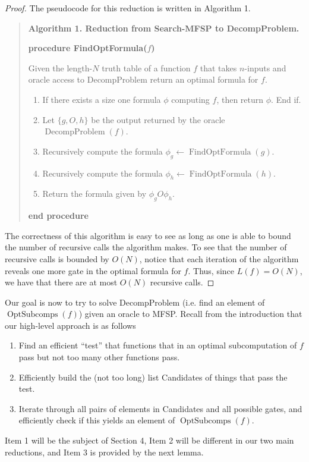 \documentclass[10pt,a4paper]{article}
\newcommand{\Opt}{\operatorname{OptSubcomps}}
\begin{document}
\begin{proof}
The pseudocode for this reduction is written in Algorithm 1.
\begin{quote}\textbf{Algorithm 1. Reduction from Search-MFSP to DecompProblem.}\par
\textbf{procedure FindOptFormula($f$)}\par
Given the length-$N$ truth table of a function $f$ that takes $n$-inputs and oracle access to DecompProblem return an optimal formula for $f$.
\begin{enumerate}
\item If there exists a size one formula $\phi$ computing $f$, then return $\phi$. End if.
\item Let $\{g,O,h\}$ be the output returned by the oracle $\operatorname{DecompProblem}(f)$.
\item Recursively compute the formula $\phi_g\leftarrow\operatorname{FindOptFormula}(g)$.
\item Recursively compute the formula $\phi_h\leftarrow\operatorname{FindOptFormula}(h)$.
\item Return the formula given by $\phi_gO\phi_h$.
\end{enumerate}
\textbf{end procedure}
\end{quote}
The correctness of this algorithm is easy to see as long as one is able to bound the number of recursive calls the algorithm makes. To see that the number of recursive calls is bounded by $O(N)$, notice that each iteration of the algorithm reveals one more gate in the optimal formula for $f$. Thus, since $L(f)=O(N)$, we have that there are at most $O(N)$ recursive calls.
\end{proof}
Our goal is now to try to solve DecompProblem (i.e. find an element of $\Opt(f)$) given an oracle to MFSP. Recall from the introduction that our high-level approach is as follows
\begin{enumerate}
\item Find an efficient ``test'' that functions that in an optimal subcomputation of $f$ pass but not too many other functions pass.
\item Efficiently build the (not too long) list Candidates of things that pass the test.
\item Iterate through all pairs of elements in Candidates and all possible gates, and efficiently check if this yields an element of $\Opt(f)$.
\end{enumerate}
Item 1 will be the subject of Section 4, Item 2 will be different in our two main reductions, and Item 3 is provided by the next lemma.
\end{document}
